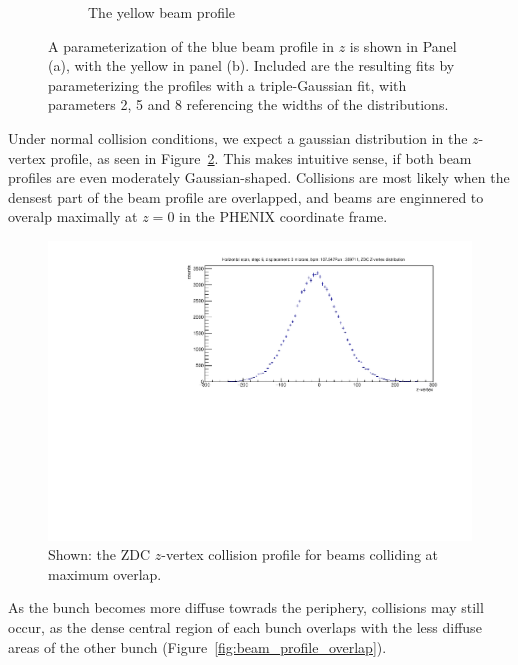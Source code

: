 \begin{figure}
\begin{subfigure}[b]{0.8\textwidth}
    \caption{The yellow beam profile}
  \end{subfigure}
  \caption{
    A parameterization of the blue beam profile in $z$ is shown in Panel (a),
    with the yellow in panel (b). Included are the resulting fits by
    parameterizing the profiles with a triple-Gaussian fit, with parameters 2, 5
    and 8 referencing the widths of the distributions.
  }
  \label{fig:z_profile}
\end{figure}

Under normal collision conditions, we expect a gaussian distribution in the
$z$-vertex profile, as seen in Figure~\ref{fig:zdc_zprofile_max_overlap}. This
makes intuitive sense, if both beam profiles are even moderately
Gaussian-shaped. Collisions are most likely when the densest part of the beam
profile are overlapped, and beams are enginnered to overalp maximally at $z=0$
in the PHENIX coordinate frame.

\begin{figure}[ht]
  \centering
  \includegraphics[width=0.8\linewidth]{./figures/zdc_zvtx_max_overlap_359711.pdf}
  \caption{
    Shown: the ZDC $z$-vertex collision profile for beams colliding at maximum
    overlap. 
  }
  \label{fig:zdc_zprofile_max_overlap}
\end{figure}

As the bunch becomes more diffuse towrads the periphery, collisions may still
occur, as the dense central region of each bunch overlaps with the less diffuse
areas of the other bunch (Figure~\ref{fig:beam_profile_overlap}).


